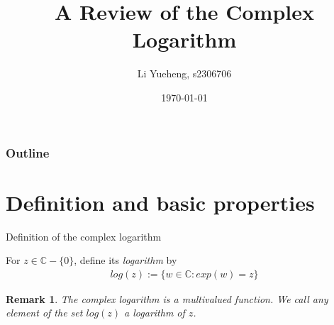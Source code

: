 \documentclass{beamer}
\title[the Complex Logarithm]{A Review of the Complex Logarithm}
\author{Li Yueheng, s2306706}
\institute{The University of Edinburgh}
\date{\today}
\newtheorem{remark}{Remark}
\begin{document}
\begin{frame}
  \titlepage
\end{frame}


\begin{frame}
\frametitle{Outline}
\tableofcontents
\end{frame}


\section{Definition and basic properties}

\begin{frame}{Definition of the complex logarithm}
\begin{definition}[1.7.1 on p.16, Gratwick]
		For $z\in \mathbb{C}-\{0\}$, define its \emph{logarithm} by
	\begin{align*}
		log(z):=\{w\in\mathbb{C}:exp(w)=z\}
	\end{align*}
\end{definition}\pause

\begin{remark}
	The complex logarithm is a \emph{multivalued function}. We call any element of the set $log(z)$ a \emph{logarithm} of $z$.
\end{remark}



\end{frame}
\end{document}
